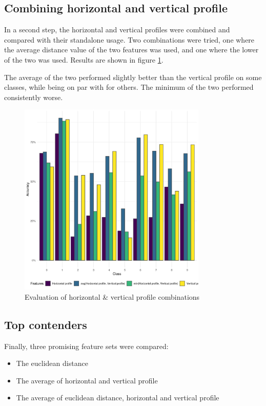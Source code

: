 \documentclass[a4paper]{scrreprt}
\begin{document}
\subsection{Combining horizontal and vertical profile}

In a second step, the horizontal and vertical profiles were combined and
compared with their standalone usage. Two combinations were tried, one where
the average distance value of the two features was used, and one where the
lower of the two was used. Results are shown in figure
\ref{fig:evaluation_profiles}.

The average of the two performed slightly better than the vertical profile on
some classes, while being on par with for others. The minimum of the two
performed consistently worse.

\begin{figure}[h]
        \centering
		\includegraphics[width=0.8\textwidth]{../resources/features_profiles.png}
		\caption{Evaluation of horizontal \& vertical profile combinations}
		\label{fig:evaluation_profiles}
\end{figure}

\subsection{Top contenders}

Finally, three promising feature sets were compared:
\begin{itemize}
		\item The euclidean distance
		\item The average of horizontal and vertical profile
		\item The average of euclidean distance, horizontal and vertical profile
\end{itemize}
\end{document}
